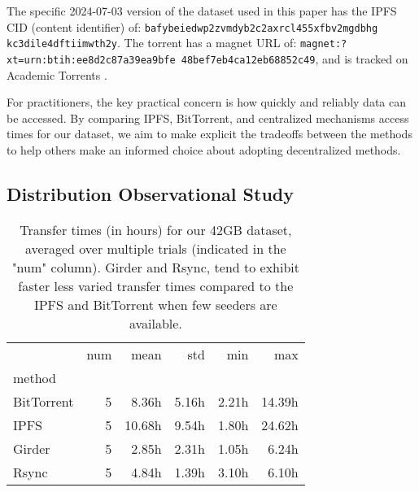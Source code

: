 \documentclass[10pt,twocolumn,letterpaper]{article}
\begin{document}
The specific 2024-07-03 version of the dataset used in this paper has the IPFS CID (content identifier) of:
{\tt bafybeiedwp2zvmdyb2c2axrcl455xfbv2mgdbhg kc3dile4dftiimwth2y}.
The torrent has a magnet URL of:
{\tt magnet:?xt=urn:btih:ee8d2c87a39ea9bfe 48bef7eb4ca12eb68852c49}, and is 
tracked on Academic Torrents \cite{academic_torrents_Cohen2014}.

For practitioners, the key practical concern is how quickly and reliably data can be accessed.
By comparing IPFS, BitTorrent, and centralized mechanisms access times for our dataset, we aim to make
  explicit the tradeoffs between the methods to help others make an informed choice about adopting
  decentralized methods.



\subsection{Distribution Observational Study}

\begin{table}[t]
\begin{tabular}{lrrrrr}
\toprule
{}      & num &   mean &    std &   min &    max \\
method         &       &        &       &       & \\
\midrule
BitTorrent & 5 &  8.36h &   5.16h &  2.21h & 14.39h \\
IPFS       & 5 & 10.68h & 9.54h & 1.80h & 24.62h \\
Girder     & 5 & 2.85h  &  2.31h  & 1.05h & 6.24h \\
Rsync      & 5 & 4.84h & 1.39h & 3.10h & 6.10h \\

\bottomrule
\end{tabular}
\caption[]{
Transfer times (in hours) for our 42GB dataset, averaged over multiple trials (indicated in the "num" column).
Girder and Rsync, tend to exhibit faster less varied transfer times compared to
the IPFS and BitTorrent when few seeders are available.
}
\label{tab:transfertime}
\end{table}
\end{document}
